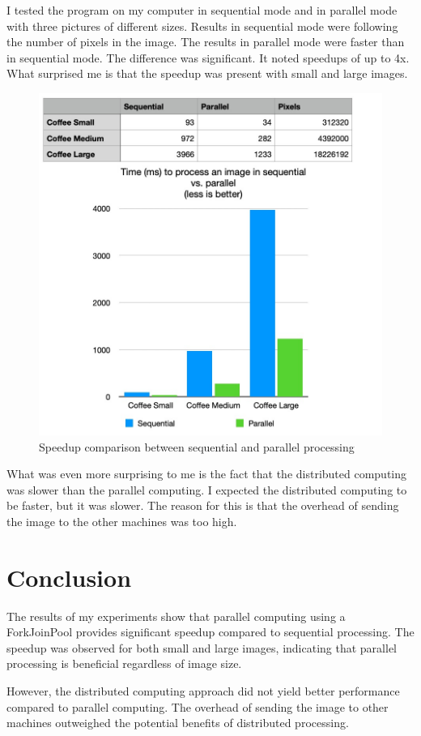 \documentclass{article}
\begin{document}
\begin{multicols}{2}
    I tested the program on my computer in sequential mode and in parallel mode with three pictures of different sizes. Results in sequential mode were following the number of pixels in the image. The results in parallel mode were faster than in sequential mode. The difference was significant. It noted speedups of up to 4x. What surprised me is that the speedup was present with small and large images.

    \begin{figure}[H]
        \centering
        \includegraphics[width=\linewidth]{img/coffee_speedup.jpg}
        \caption{Speedup comparison between sequential and parallel processing}
        \label{fig:speedup}
    \end{figure}

    What was even more surprising to me is the fact that the distributed computing was slower than the parallel computing. I expected the distributed computing to be faster, but it was slower. The reason for this is that the overhead of sending the image to the other machines was too high.

    \section{Conclusion}

    The results of my experiments show that parallel computing using a ForkJoinPool provides significant speedup compared to sequential processing. The speedup was observed for both small and large images, indicating that parallel processing is beneficial regardless of image size.

    However, the distributed computing approach did not yield better performance compared to parallel computing. The overhead of sending the image to other machines outweighed the potential benefits of distributed processing.

\end{multicols}

\printbibliography[heading=bibintoc, title={References}]
\end{document}
